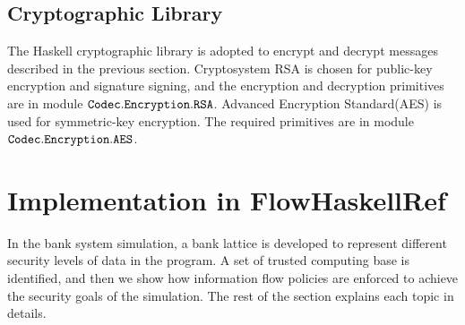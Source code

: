 \documentclass[a4paper]{report}
\newcommand{\co}[1]{$\cod{#1}$}
\begin{document}
\subsection{Cryptographic Library} 
The Haskell cryptographic library is adopted to encrypt and decrypt messages described in the previous section.
Cryptosystem RSA is chosen for public-key encryption and signature signing, and the encryption and 
decryption primitives are in module \co{Codec.Encryption.RSA}.
Advanced Encryption Standard(AES) is used for symmetric-key encryption. The required primitives are in module
\co{Codec.Encryption.AES}.


\section{Implementation in FlowHaskellRef}
In the bank system simulation, a bank lattice is developed to represent different security levels of data in the program. 
A set of trusted computing base is identified, and then we show how information flow policies are enforced to
achieve the security goals of the simulation. The rest of the section explains each topic in details.
\end{document}
